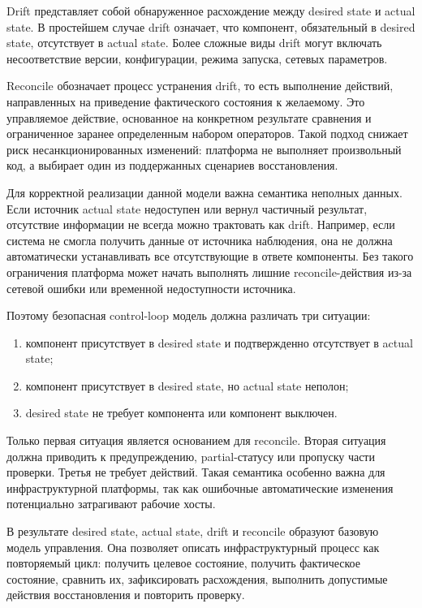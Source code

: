 Drift представляет собой обнаруженное расхождение между desired state и actual state. В простейшем случае drift означает, что компонент, обязательный в desired state, отсутствует в actual state. Более сложные виды drift могут включать несоответствие версии, конфигурации, режима запуска, сетевых параметров.

Reconcile обозначает процесс устранения drift, то есть выполнение действий, направленных на приведение фактического состояния к желаемому. Это управляемое действие, основанное на конкретном результате сравнения и ограниченное заранее определенным набором операторов. Такой подход снижает риск несанкционированных изменений: платформа не выполняет произвольный код, а выбирает один из поддержанных сценариев восстановления.

Для корректной реализации данной модели важна семантика неполных данных. Если источник actual state недоступен или вернул частичный результат, отсутствие информации не всегда можно трактовать как drift. Например, если система не смогла получить данные от источника наблюдения, она не должна автоматически устанавливать все отсутствующие в ответе компоненты. Без такого ограничения платформа может начать выполнять лишние reconcile-действия из-за сетевой ошибки или временной недоступности источника.

Поэтому безопасная control-loop модель должна различать три ситуации:
\begin{enumerate}
    \item компонент присутствует в desired state и подтвержденно отсутствует в actual state;
    \item компонент присутствует в desired state, но actual state неполон;
    \item desired state не требует компонента или компонент выключен.
\end{enumerate}

Только первая ситуация является основанием для reconcile. Вторая ситуация должна приводить к предупреждению, partial-статусу или пропуску части проверки. Третья не требует действий. Такая семантика особенно важна для инфраструктурной платформы, так как ошибочные автоматические изменения потенциально затрагивают рабочие хосты.

В результате desired state, actual state, drift и reconcile образуют базовую модель управления. Она позволяет описать инфраструктурный процесс как повторяемый цикл: получить целевое состояние, получить фактическое состояние, сравнить их, зафиксировать расхождения, выполнить допустимые действия восстановления и повторить проверку.

